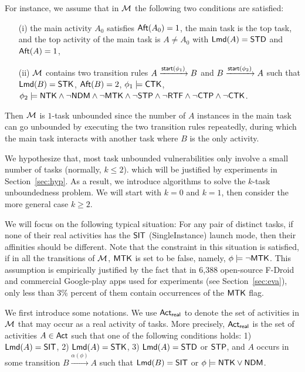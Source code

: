 For instance, we assume that in ${\mathcal{M} }$ the following two conditions are satisfied:
\begin{itemize}
\item[(i)] the main activity $A_0$ satisfies ${\sf Aft}(A_0) = 1$, the main task is the top task, and the top activity of the main task is $A \neq A_0$ with ${\sf Lmd}(A) = {\sf STD}$ and ${\sf Aft}(A) = 1$, 
%
\item[(ii)] ${\mathcal{M} }$ contains two transition rules $A \xrightarrow{{\mathsf{start} }(\phi_1)} B$ and $B \xrightarrow{{\mathsf{start} }(\phi_2)} A$ such that ${\sf Lmd}(B) = {\sf STK}$, ${\sf Aft}(B) = 2$, $\phi_1 \models {\sf CTK}$, $\phi_2 \models {\sf NTK} \wedge \neg {\sf NDM}\wedge \neg {\sf MTK} \wedge \neg {\sf STP} \wedge \neg {\sf RTF} \wedge \neg {\sf CTP} \wedge \neg {\sf CTK}$. 
\end{itemize}
Then ${\mathcal{M} }$ is $1$-task unbounded since the number of $A$ instances in the main task can go unbounded by executing the two transition rules repeatedly, during which the main task interacts with another task where $B$ is the only activity.

We hypothesize that, most task unbounded vulnerabilities %
only involve a small number of tasks (normally, $k\leq 2$). 
which will be justified by experiments in Section~\ref{sec:hyp}.
As a result, we introduce algorithms to solve the $k$-task unboundedness problem. We will start with $k = 0$ and $k = 1$, then consider the more general case $k \ge 2$.

We will focus on the following typical situation: For any pair of distinct tasks, if none of their real activities has the ${\sf SIT}$ (SingleInstance) launch mode, then their affinities should be different. Note that the constraint in this situation is satisfied, if in all the transitions of ${\mathcal{M} }$, ${\sf MTK}$ is set to be false, namely, $\phi \models \neg {\sf MTK}$. This assumption is empirically justified by the fact that in 6,388 open-source F-Droid and commercial Google-play apps used for experiments (see Section~\ref{sec:eva}), only less than 3\% percent of them contain occurrences of the ${\sf MTK}$ flag. 

We first introduce some notations. We use ${\sf Act}_{\sf real}$ to denote the set of activities in ${\mathcal{M} }$ that may occur as a real activity of tasks. More precisely, ${\sf Act}_{\sf real}$ is  the set of activities $A \in {\sf Act}$ such that one of the following conditions holds: 1) ${\sf Lmd}(A) = {\sf SIT}$,  2) ${\sf Lmd}(A) = {\sf STK}$, 3) ${\sf Lmd}(A) = {\sf STD}$ or ${\sf STP}$, and $A$ occurs in some transition $B \xrightarrow{\alpha(\phi)} A$ such that ${\sf Lmd}(B) = {\sf SIT}$ or  $\phi \models {\sf NTK}\vee{\sf NDM}$. 

